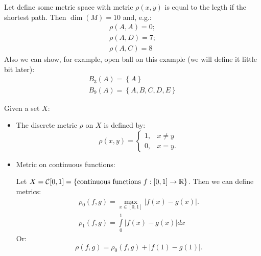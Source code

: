 Let define some metric space with metric $\rho(x,y)$ is equal to the legth if the shortest path. Then $\dim (M) = 10$ and, e.g.:
\[
    \begin{array}{c}
        \rho(A,A) = 0;\\
        \rho(A, D) = 7;\\
        \rho(A, C) = 8
    \end{array}  
\]
Also we can show, for example, open ball on this example (we will define it little bit later):
\[
    \begin{array}{c}
        B_3(A) = \left\{A\right\}\\
        B_9(A) = \left\{A, B, C, D, E\right\}
    \end{array}  
\]

\par 
\Ex Given a set $X$:
\begin{itemize}
    \item The discrete metric $\rho$ on $X$ is defined by:
    \[
        \rho(x,y) = \left\{
            \begin{array}{cc}
                1 ,  & x \neq y\\
                0, & x = y.
            \end{array}
        \right.  
    \]
    \item Metric on continuous functions:
    \par 
    Let $X = \mathcal{C}[0,1] = \left\{\text{continuous functions } f: [0,1] \to \mathbb{R}\right\}$.
    Then we can define metrics:
    \[
            \begin{array}{c}
                \displaystyle\rho_0 (f,g) = \max\limits_{x \in [0,1]} |f(x) - g(x)|.\\
                \displaystyle\rho_1 (f,g) = \int\limits_{0}^1 |f(x) - g(x)|dx
            \end{array}
    \]
    Or: 
    \[
        \rho(f,g) = \rho_0(f,g) + |f(1) - g(1)|.
    \]
    \vspace*{-2cm}

    \begin{figure}[H]
        \centering

 


 
\tikzset{
pattern size/.store in=\mcSize, 
pattern size = 5pt,
pattern thickness/.store in=\mcThickness, 
pattern thickness = 0.3pt,
pattern radius/.store in=\mcRadius, 
pattern radius = 1pt}
\makeatletter
{}
\makeatother


\end{figure}
\end{itemize}
